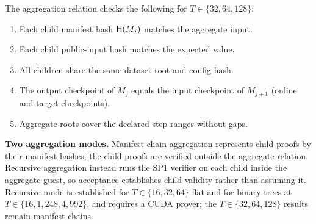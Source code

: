 The aggregation relation checks the following for $T \in \{32, 64, 128\}$:

\begin{enumerate}[leftmargin=1.8em]
  \item Each child manifest hash $\mathsf{H}(M_j)$ matches the aggregate input.
  \item Each child public-input hash matches the expected value.
  \item All children share the same dataset root and config hash.
  \item The output checkpoint of $M_j$ equals the input checkpoint of
  $M_{j+1}$ (online and target checkpoints).
  \item Aggregate roots cover the declared step ranges without gaps.
\end{enumerate}

\noindent\textbf{Two aggregation modes.} Manifest-chain aggregation represents
child proofs by their manifest hashes; the child proofs are verified outside
the aggregate relation. Recursive aggregation instead runs the SP1 verifier on
each child inside the aggregate guest, so acceptance establishes child validity
rather than assuming it. Recursive mode is established for $T\in\{16,32,64\}$ flat
and for binary trees at $T\in\{16,1{,}248,4{,}992\}$, and
requires a CUDA prover; the $T\in\{32,64,128\}$ results remain manifest chains.
